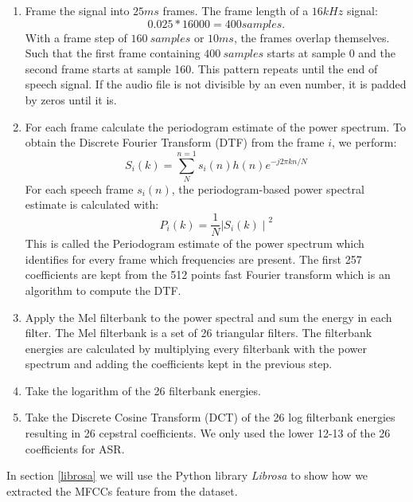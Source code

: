 \begin{enumerate}[label=\arabic*.]
  \item Frame the signal into $25ms$ frames. The frame length of a $16kHz$
    signal:
  \begin{equation} 
    0.025*16000 = 400 samples.
  \end{equation}
  With a frame step of $160\ samples$ or $10ms$, the frames overlap themselves.
  Such that the first frame containing $400\ samples$ starts at sample 0 and the
  second frame starts at sample 160. This pattern repeats until the end of
  speech signal. If the audio file is not divisible by an even number, it is
  padded by zeros until it is.\\
  \item For each frame calculate the periodogram estimate of the power spectrum.
    To obtain the Discrete Fourier Transform (DTF) from the frame $i$, we
    perform:
    \begin{equation}
      S_{i}(k) = \sum_{N}^{n=1}s_i(n)h(n)e^{-j2\pi kn/N}
    \end{equation}
    For each speech frame $s_{i}(n)$, the periodogram-based power spectral
    estimate is calculated with:
    \begin{equation}
      P_{i}(k)=\frac{1}{N}{\mid{S_{i}(k)}\mid}^{2}
    \end{equation}
  This is called the Periodogram estimate of the power spectrum which identifies
  for every frame which frequencies are present. The first 257 coefficients are
  kept from the 512 points fast Fourier transform which is an algorithm to
  compute the DTF.\\
  \item Apply the Mel filterbank to the power spectral and sum the energy in
    each filter. The Mel filterbank is a set of 26 triangular filters. The
    filterbank energies are calculated by multiplying every filterbank with the
    power spectrum and adding the coefficients kept in the previous step.\\
  \item Take the logarithm of the 26 filterbank energies.\\
  \item Take the Discrete Cosine Transform (DCT) of the 26 log filterbank
    energies resulting in 26 cepstral coefficients. We only used the lower 12-13
    of the 26 coefficients for ASR.\\
\end{enumerate}

In section \ref{librosa} we will use the Python library \textit{Librosa} to show how we extracted the
MFCCs feature from the dataset.

